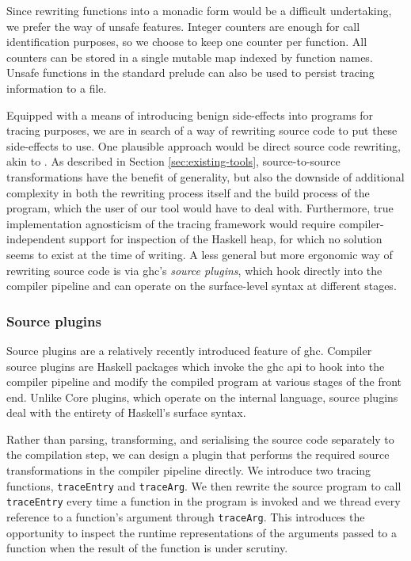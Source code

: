 \documentclass[thesis=B,english]{FITthesis}[2019/12/23]
\newcommand{\hsIdent}[1]{\texttt{#1}}
\begin{document}
Since rewriting functions into a monadic form would be a difficult undertaking,
we prefer the way of unsafe features. Integer counters are enough for call
identification purposes, so we choose to keep one counter per function. All
counters can be stored in a single mutable map indexed by function names.
Unsafe functions in the standard prelude can also be used to persist tracing
information to a file.

Equipped with a means of introducing benign side-effects into programs for
tracing purposes, we are in search of a way of rewriting source code to put
these side-effects to use. One plausible approach would be direct source code
rewriting, akin to . As described in Section
\ref{sec:existing-tools}, source-to-source transformations have the benefit of
generality, but also the downside of additional complexity in both the
rewriting process itself and the build process of the program, which the user
of our tool would have to deal with. Furthermore, true implementation
agnosticism of the tracing framework would require compiler-independent support
for inspection of the Haskell heap, for which no solution seems to exist at the
time of writing. A less general but more ergonomic way of rewriting source code
is via \acrshort{ghc}'s \textit{source plugins}, which hook directly into the
compiler pipeline and can operate on the surface-level syntax at different
stages.

\subsubsection*{Source plugins}
Source plugins\cite{ghc-source-plugins} are a relatively recently introduced
feature of \acrshort{ghc}. Compiler source plugins are Haskell packages which
invoke the \acrshort{ghc} \acrshort{api} to hook into the compiler pipeline and
modify the compiled program at various stages of the front end. Unlike Core
plugins\cite{ghc-compiler-plugins}, which operate on the internal language,
source plugins deal with the entirety of Haskell's surface syntax.

Rather than parsing, transforming, and serialising the source code separately
to the compilation step, we can design a plugin that performs the required
source transformations in the compiler pipeline directly. We introduce two
tracing functions, \hsIdent{traceEntry} and \hsIdent{traceArg}. We then rewrite
the source program to call \hsIdent{traceEntry} every time a function in the
program is invoked and we thread every reference to a function's argument
through \hsIdent{traceArg}. This introduces the opportunity to inspect the
runtime representations of the arguments passed to a function when the result
of the function is under scrutiny.
\end{document}
